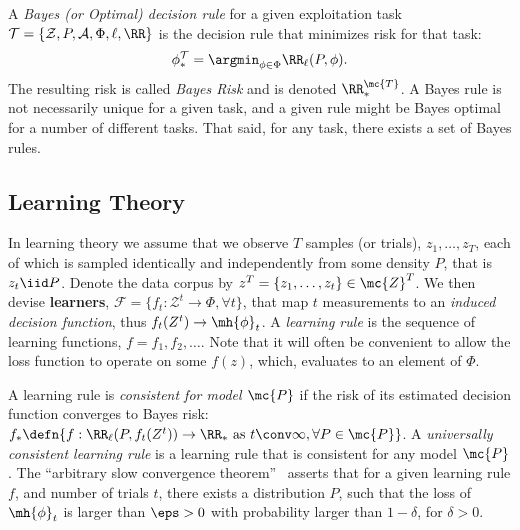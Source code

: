 \documentclass{article}
\begin{document}
\noindent  A \emph{Bayes (or Optimal) decision rule} for a given exploitation task $\mathcal{T}=\{\mathcal{Z}, P, \mathcal{A}, \Phi, \ell, \RR\}$ is the decision rule that minimizes risk for that task: 
\begin{align}
    \phi_*^\mathcal{T} = \argmin_{\phi \in \Phi} \RR_\ell(P,\phi).
\end{align}
The resulting risk is called \emph{Bayes Risk} and is denoted $\RR_*^{\mc{T}}$.  A Bayes rule is not necessarily unique for a given task, and a given rule might be Bayes optimal for a number of different tasks.  That said, for any task, there exists a set of Bayes rules.  


\subsection{Learning Theory}



In learning theory we assume that we observe $T$ samples (or trials), $z_1,\ldots, z_T$, each of which is sampled identically and independently from some density $P$, that is $z_t \iid P$.  Denote the data corpus by $z^T =\{z_1,\ldots, z_t\} \in \mc{Z}^T$.  
We then devise  \textbf{learners}, $\mathcal{F} = \{f_t : \mathcal{Z}^t \to \Phi, \forall t\}$, that map $t$ measurements to an \emph{induced decision function}, thus $f_t(Z^t) \to \mh{\phi}_t$. 
A \emph{learning rule} is the sequence of learning functions, $f= f_1,f_2,\ldots$.  Note that it will often be convenient to allow the loss function to operate on some $f(z)$, which, evaluates to an element of $\Phi$.

A learning rule is \emph{consistent for model $\mc{P}$} if the risk of its estimated decision function converges to Bayes risk:
$f_* \defn \{ f : \RR_\ell(P,f_t(Z^t)) \to \RR_* \text{ as } t \conv \infty, \forall P \in \mc{P} \}$.
A \emph{universally consistent learning rule} is a learning rule that is consistent for any model $\mc{P}$. 
%
The ``arbitrary slow convergence theorem''~\cite{Devroye1997-bd}  asserts that for a given learning rule $f$, and number of trials $t$, there exists a distribution $P$, such that the loss of $\mh{\phi}_t$ is larger than $\eps > 0$ with  probability larger than $1-\delta$, for $\delta>0$.   
\end{document}
